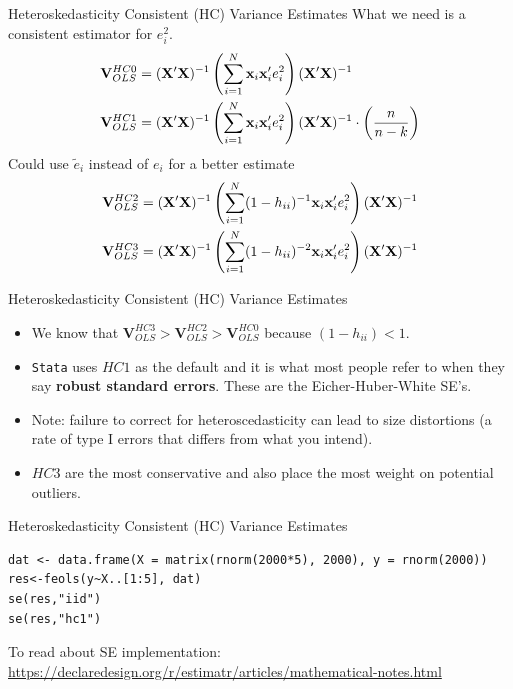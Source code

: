 



\begin{frame}{Heteroskedasticity Consistent (HC) Variance Estimates}
What we need is a consistent estimator for $e^2_i$.
\begin{align*}
\mathbf{V}_{OLS}^{HC0}&= ({\bf X}' {\bf X})^{-1} \left(\sum_{i=1}^N {\bf x}_i {\bf x}_i'  e_i^2 \right) ({\bf X}' {\bf X})^{-1} \\
\mathbf{V}_{OLS}^{HC1}&= ({\bf X}' {\bf X})^{-1} \left(\sum_{i=1}^N {\bf x}_i {\bf x}_i'  e_i^2 \right) ({\bf X}' {\bf X})^{-1} \cdot \left(\frac{n}{n-k}  \right)
\end{align*}
Could use $\tilde{e}_i$ instead of $e_i$ for a better estimate
\begin{align*}
\mathbf{V}_{OLS}^{HC2}&= ({\bf X}' {\bf X})^{-1} \left(\sum_{i=1}^N (1-h_{ii})^{-1} {\bf x}_i {\bf x}_i' e_i^2 \right) ({\bf X}' {\bf X})^{-1} \\
\mathbf{V}_{OLS}^{HC3}&= ({\bf X}' {\bf X})^{-1} \left(\sum_{i=1}^N (1-h_{ii})^{-2} {\bf x}_i {\bf x}_i' e_i^2 \right) ({\bf X}' {\bf X})^{-1} \\
\end{align*}
\end{frame}


\begin{frame}{Heteroskedasticity Consistent (HC) Variance Estimates}
\begin{itemize}
\item We know that $\mathbf{V}_{OLS}^{HC3} > \mathbf{V}_{OLS}^{HC2} > \mathbf{V}_{OLS}^{HC0}$ because $(1- h_{ii}) <1$.
\item \texttt{Stata} uses $HC1$ as the default and it is what most people refer to when they say {\bf robust standard errors}.
	These are the Eicher-Huber-White SE's.
\item Note: failure to correct for heteroscedasticity can lead to size distortions (a rate of type I errors that differs from what you intend). 
\item $HC3$ are the most conservative and also place the most weight on potential outliers.
\end{itemize}
\end{frame}


\begin{frame}[fragile]{Heteroskedasticity Consistent (HC) Variance Estimates}
\footnotesize
\begin{lstlisting}
dat <- data.frame(X = matrix(rnorm(2000*5), 2000), y = rnorm(2000))
res<-feols(y~X..[1:5], dat)
se(res,"iid")
se(res,"hc1")
\end{lstlisting}
To read about SE implementation:
\url{ https://declaredesign.org/r/estimatr/articles/mathematical-notes.html}
\end{frame}




